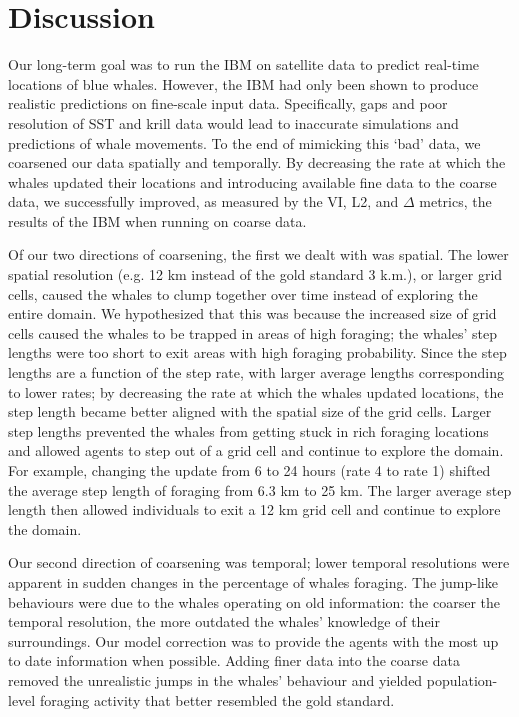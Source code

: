 \documentclass[11pt]{article}
\begin{document}
\section{Discussion}
Our long-term goal was to run the IBM on satellite data to predict real-time locations of blue whales. However, the IBM had only been shown to produce realistic predictions on fine-scale input data. Specifically, gaps and poor resolution of SST and krill data would lead to inaccurate simulations and predictions of whale movements. To the end of mimicking this ‘bad’ data, we coarsened our data spatially and temporally. By decreasing the rate at which the whales updated their locations and introducing available fine data to the coarse data, we successfully improved, as measured by the VI, L2, and $\Delta$ metrics, the results of the IBM when running on coarse data.\par 

Of our two directions of coarsening, the first we dealt with was spatial. The lower spatial resolution (e.g. 12 km instead of the gold standard 3 k.m.), or larger grid cells, caused the whales to clump together over time instead of exploring the entire domain. We hypothesized that this was because the increased size of grid cells caused the whales to be trapped in areas of high foraging; the whales’ step lengths were too short to exit areas with high foraging probability. Since the step lengths are a function of the step rate, with larger average lengths corresponding to lower rates; by decreasing the rate at which the whales updated locations, the step length became better aligned with the spatial size of the grid cells. Larger step lengths prevented the whales from getting stuck in rich foraging locations and allowed agents to step out of a grid cell and continue to explore the domain.  For example, changing the update from 6 to 24 hours (rate 4 to rate 1) shifted the average step length of foraging from 6.3 km to 25 km. The larger average step length then allowed individuals to exit a 12 km grid cell and continue to explore the domain. \par 

Our second direction of coarsening was temporal; lower temporal resolutions were apparent in sudden changes in the percentage of whales foraging. The jump-like behaviours were due to the whales operating on old information: the coarser the temporal resolution, the more outdated the whales’ knowledge of their surroundings. Our model correction was to provide the agents with the most up to date information when possible. Adding finer data into the coarse data removed the unrealistic jumps in the whales’ behaviour and yielded population-level foraging activity that better resembled the gold standard.\par 
\end{document}
